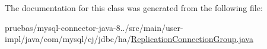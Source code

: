 The documentation for this class was generated from the following file\+:\begin{DoxyCompactItemize}
\item 
pruebas/mysql-\/connector-\/java-\/8../src/main/user-\/impl/java/com/mysql/cj/jdbc/ha/\mbox{\hyperlink{_replication_connection_group_8java}{Replication\+Connection\+Group.\+java}}\end{DoxyCompactItemize}
